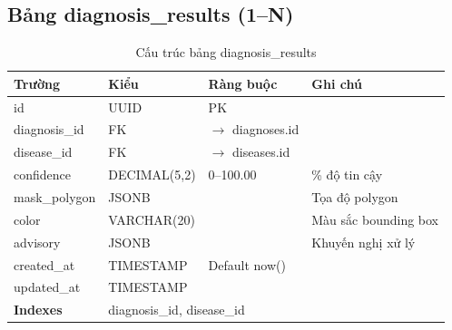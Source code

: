\documentclass[12pt,a4paper]{article}
\begin{document}
\subsection{Bảng diagnosis\_results (1--N)}
\begin{longtable}{|l|l|l|p{5.5cm}|}
    \caption{Cấu trúc bảng diagnosis\_results}                                                                             \\
    \hline
    \rowcolor{headerblue}
    \textbf{Trường}  & \textbf{Kiểu}                                   & \textbf{Ràng buộc}         & \textbf{Ghi chú}     \\
    \hline
    id               & UUID                                            & PK                         &                      \\
    \hline
    diagnosis\_id    & FK                                              & $\rightarrow$ diagnoses.id &                      \\
    \hline
    disease\_id      & FK                                              & $\rightarrow$ diseases.id  &                      \\
    \hline
    confidence       & DECIMAL(5,2)                                    & 0--100.00                  & \% độ tin cậy        \\
    \hline
    mask\_polygon    & JSONB                                           &                            & Tọa độ polygon       \\
    \hline
    color            & VARCHAR(20)                                     &                            & Màu sắc bounding box \\
    \hline
    advisory         & JSONB                                           &                            & Khuyến nghị xử lý    \\
    \hline
    created\_at      & TIMESTAMP                                       & Default now()              &                      \\
    \hline
    updated\_at      & TIMESTAMP                                       &                            &                      \\
    \hline
    \rowcolor{headerblue}
    \textbf{Indexes} & \multicolumn{3}{l|}{diagnosis\_id, disease\_id}                                                     \\
    \hline
\end{longtable}
\end{document}
